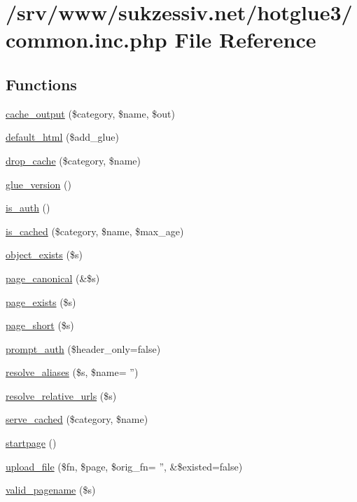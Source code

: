 \hypertarget{common_8inc_8php}{
\section{/srv/www/sukzessiv.net/hotglue3/common.inc.php File Reference}
\label{common_8inc_8php}
}
\subsection*{Functions}
\begin{CompactItemize}
\item 
\hyperlink{common_8inc_8php_6cceb5c6a3c421c18e925515c78f6dfd}{cache\_\-output} (\$category, \$name, \$out)
\item 
\hyperlink{common_8inc_8php_8916cb6ec34ceeb3f48c86655c305974}{default\_\-html} (\$add\_\-glue)
\item 
\hyperlink{common_8inc_8php_7ca47f8aab349971cde2d4b02441cf41}{drop\_\-cache} (\$category, \$name)
\item 
\hyperlink{common_8inc_8php_0d6d0da45f4adf6283bcccec9fd107e3}{glue\_\-version} ()
\item 
\hyperlink{common_8inc_8php_b3abbb2cd13e01231533e7cdc93da6db}{is\_\-auth} ()
\item 
\hyperlink{common_8inc_8php_6fb34b9210b43349ca3eb16b2738a28b}{is\_\-cached} (\$category, \$name, \$max\_\-age)
\item 
\hyperlink{common_8inc_8php_3d71a269e01b98748fb57719feef27be}{object\_\-exists} (\$s)
\item 
\hyperlink{common_8inc_8php_31ed04b0c90ac3077e71743c307d45f8}{page\_\-canonical} (\&\$s)
\item 
\hyperlink{common_8inc_8php_a71868111dd5b8af98df9cc9c968e523}{page\_\-exists} (\$s)
\item 
\hyperlink{common_8inc_8php_da968adfb989aa09adaf29867208f1ab}{page\_\-short} (\$s)
\item 
\hyperlink{common_8inc_8php_80c23c9d8ac02159151d6368506b1b54}{prompt\_\-auth} (\$header\_\-only=false)
\item 
\hyperlink{common_8inc_8php_78992fdfae6cd9d7d4e8053d004d1709}{resolve\_\-aliases} (\$s, \$name= '')
\item 
\hyperlink{common_8inc_8php_81eb70073067db81ab43829870f15e6d}{resolve\_\-relative\_\-urls} (\$s)
\item 
\hyperlink{common_8inc_8php_ac90387dcab722e243df2d083f8d6a00}{serve\_\-cached} (\$category, \$name)
\item 
\hyperlink{common_8inc_8php_0a3ee1e9beca572266648f17b9c4c75f}{startpage} ()
\item 
\hyperlink{common_8inc_8php_4659077c34b709eec75f9897ea07e55a}{upload\_\-file} (\$fn, \$page, \$orig\_\-fn= '', \&\$existed=false)
\item 
\hyperlink{common_8inc_8php_0ef613d233a6e62f7e631b8dfcd710bf}{valid\_\-pagename} (\$s)
\end{CompactItemize}


